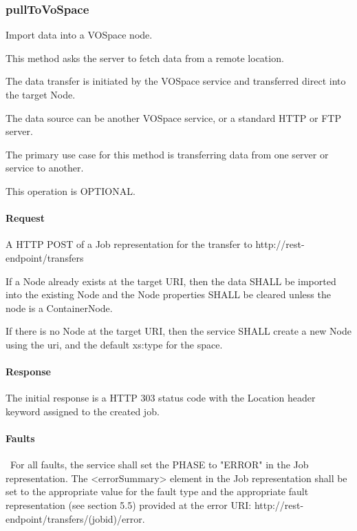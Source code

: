 \documentclass[11pt,a4paper]{ivoa}
\begin{document}
\subsubsection{pullToVoSpace}
\label{subsubsec:pulltovospace}
Import data into a VOSpace node.

This method asks the server to fetch data from a remote location.

The data transfer is initiated by the VOSpace service and transferred direct into the target Node.

The data source can be another VOSpace service, or a standard HTTP or FTP server.

The primary use case for this method is transferring data from one server or service to another.

This operation is OPTIONAL.

\paragraph{Request}
A HTTP POST of a Job representation for the transfer to http://rest-endpoint/transfers

If a Node already exists at the target URI, then the data SHALL be imported into the existing Node and the Node properties SHALL be cleared unless the node is a ContainerNode.

If there is no Node at the target URI, then the service SHALL create a new Node using the uri, and the default xs:type for the space.

\paragraph{Response}
The initial response is a HTTP 303 status code with the Location header keyword assigned to the created job.

\paragraph{Faults}\
For all faults, the service shall set the PHASE to "ERROR" in the Job representation. The <errorSummary> element in the Job representation shall be set to the appropriate value for the fault type and the appropriate fault representation (see section 5.5) provided at the error URI: http://rest-endpoint/transfers/(jobid)/error.
\end{document}
